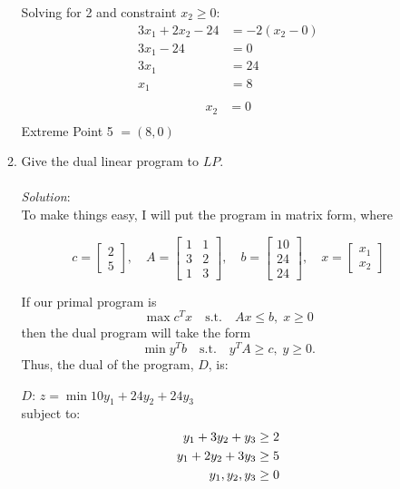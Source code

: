 \documentclass{article}
\begin{document}
\begin{enumerate}
\begin{enumerate}
    Solving for 2 and constraint $x_2 \ge 0$:\\
    \begin{align*}
    3x_{1} + 2x_{2} - 24  &=  -2(x_{2} - 0) \\
             3x_{1} - 24  &=  0 \\
                  3x_{1}  &=  24 \\
                   x_{1}  &=  8 \\
    \end{align*}
    \begin{align*}
    x_{2}  &=  0 \\
    \end{align*}
    Extreme Point 5 $= (8, 0)$ \\

    \item Give the dual linear program to $LP$. \\\\
    \textit{Solution}:\\
    To make things easy, I will put the program in matrix form, where

    \[
    c = \begin{bmatrix}
    2 \\
    5
    \end{bmatrix}, \quad
    A = \begin{bmatrix}
    1  &  1 \\
    3  &  2 \\
    1  &  3
    \end{bmatrix}, \quad
    b = \begin{bmatrix}
    10 \\
    24 \\
    24
    \end{bmatrix}, \quad
    x = \begin{bmatrix}
    x_{1} \\
    x_{2}
    \end{bmatrix}
    \]

    If our primal program is 
    $$\max c^{T}x \quad \text{s.t.} \quad Ax \le b, \; x \ge 0$$
    then the dual program will take the form 
    $$\min y^{T}b \quad \text{s.t.} \quad y^{T}A \ge c, \; y \ge 0.$$
    Thus, the dual of the program, $D$, is:

    $D$: $z = \min 10y_{1} + 24y_{2} + 24y_{3}$ \\
    subject to:
    \begin{align}
    y_{1}  +  3y_{2}  +   y_{3}  \ge& \; 2 \\
    y_{1}  +  2y_{2}  +  3y_{3}  \ge& \; 5 \\
    y_{1}  ,   y_{2}  ,   y_{3}  \ge& \; 0 \notag
    \end{align}


\end{enumerate}
\end{enumerate}
\end{document}
